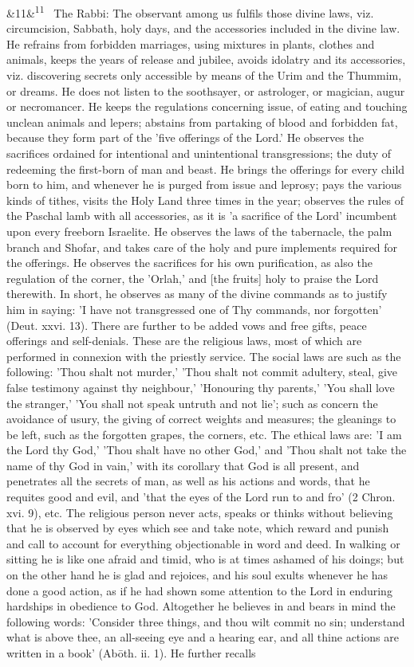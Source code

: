 \documentclass[12pt]{article}
\newcommand{\para}[1][]{\par\noindent\ifx&#1&\else\textsuperscript{\footnotesize #1}~\fi}
\begin{document}
\para[11] The Rabbi: The observant among us fulfils those divine laws, viz. circumcision, Sabbath, holy days, and the accessories included in the divine law. He refrains from forbidden marriages, using mixtures in plants, clothes and animals, keeps the years of release and jubilee, avoids idolatry and its accessories, viz. discovering secrets only accessible by means of the Urim and the Thummim, or dreams. He does not listen to the soothsayer, or astrologer, or magician, augur or necromancer. He keeps the regulations concerning issue, of eating and touching unclean animals and lepers; abstains from partaking of blood and forbidden fat, because they form part of the 'five offerings of the Lord.' He observes the sacrifices ordained for intentional and unintentional transgressions; the duty of redeeming the first-born of man and beast. He brings the offerings for every child born to him, and whenever he is purged from issue and leprosy; pays the various kinds of tithes, visits the Holy Land three times in the year; observes the rules of the Paschal lamb with all accessories, as it is 'a sacrifice of the Lord' incumbent upon every freeborn Israelite. He observes the laws of the tabernacle, the palm branch and Shofar, and takes care of the holy and pure implements required for the offerings. He observes the sacrifices for his own purification, as also the regulation of the corner, the 'Orlah,' and [the fruits] holy to praise the Lord therewith. In short, he observes as many of the divine commands as to justify him in saying: 'I have not transgressed one of Thy commands, nor forgotten' (Deut. xxvi. 13). There are further to be added vows and free gifts, peace offerings and self-denials. These are the religious laws, most of which are performed in connexion with the priestly service. The social laws are such as the following: 'Thou shalt not murder,' 'Thou shalt not commit adultery, steal, give false testimony against thy neighbour,' 'Honouring thy parents,' 'You shall love the stranger,' 'You shall not speak untruth and not lie'; such as concern the avoidance of usury, the giving of correct weights and measures; the gleanings to be left, such as the forgotten grapes, the corners, etc. The ethical laws are: 'I am the Lord thy God,' 'Thou shalt have no other God,' and 'Thou shalt not take the name of thy God in vain,' with its corollary that God is all present, and penetrates all the secrets of man, as well as his actions and words, that he requites good and evil, and 'that the eyes of the Lord run to and fro' (2 Chron. xvi. 9), etc. The religious person never acts, speaks or thinks without believing that he is observed by eyes which see and take note, which reward and punish and call to account for everything objectionable in word and deed. In walking or sitting he is like one afraid and timid, who is at times ashamed of his doings; but on the other hand he is glad and rejoices, and his soul exults whenever he has done a good action, as if he had shown some attention to the Lord in enduring hardships in obedience to God. Altogether he believes in and bears in mind the following words: 'Consider three things, and thou wilt commit no sin; understand what is above thee, an all-seeing eye and a hearing ear, and all thine actions are written in a book' (Abōth. ii. 1). He further recalls 
\end{document}
